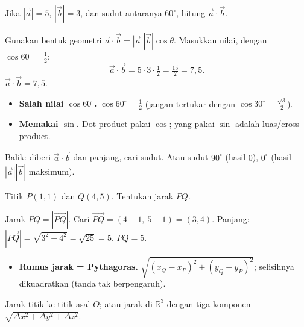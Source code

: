 \begin{soalbox}{}
Jika $|\vec a|=5$, $|\vec b|=3$, dan sudut antaranya $60^\circ$, hitung
$\vec a\cdot\vec b$.
\end{soalbox}

\jawab
{} Gunakan bentuk geometri $\vec a\cdot\vec b=|\vec a||\vec b|\cos\theta$.
 Masukkan nilai, dengan $\cos60^\circ=\tfrac12$:
\[
\vec a\cdot\vec b=5\cdot3\cdot\tfrac12=\tfrac{15}{2}=7{,}5.
\]
\jadi $\vec a\cdot\vec b=7{,}5$.

\begin{jebakan}
\begin{itemize}[leftmargin=*,topsep=2pt]
  \item \textbf{Salah nilai $\cos60^\circ$.} $\cos60^\circ=\frac12$ (jangan
  tertukar dengan $\cos30^\circ=\frac{\sqrt3}{2}$).
  \item \textbf{Memakai $\sin$.} Dot product pakai $\cos$; yang pakai $\sin$
  adalah luas/cross product.
\end{itemize}
\end{jebakan}

\begin{variasi}
Balik: diberi $\vec a\cdot\vec b$ dan panjang, cari sudut. Atau sudut $90^\circ$
(hasil $0$), $0^\circ$ (hasil $|\vec a||\vec b|$ maksimum).
\end{variasi}

\begin{soalbox}{}
Titik $P(1,1)$ dan $Q(4,5)$. Tentukan jarak $PQ$.
\end{soalbox}

\jawab
{} Jarak $PQ=|\vec{PQ}|$. Cari $\vec{PQ}=(4-1,\ 5-1)=(3,4)$.
 Panjang: $|\vec{PQ}|=\sqrt{3^2+4^2}=\sqrt{25}=5$.
\jadi $PQ=5$.

\begin{jebakan}
\begin{itemize}[leftmargin=*,topsep=2pt]
  \item \textbf{Rumus jarak = Pythagoras.} $\sqrt{(x_Q-x_P)^2+(y_Q-y_P)^2}$;
  selisihnya dikuadratkan (tanda tak berpengaruh).
\end{itemize}
\end{jebakan}

\begin{variasi}
Jarak titik ke titik asal $O$; atau jarak di $\mathbb R^3$ dengan tiga komponen
$\sqrt{\Delta x^2+\Delta y^2+\Delta z^2}$.
\end{variasi}

